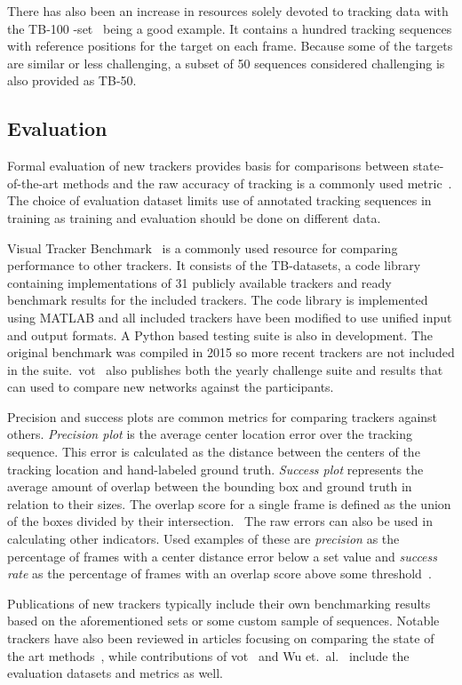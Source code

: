 There has also been an increase in resources solely devoted to tracking data with the TB-100 -set~\cite{VTB} being a good example. It contains a hundred tracking sequences with reference positions for the target on each frame. Because some of the targets are similar or less challenging, a subset of 50 sequences considered challenging is also provided as TB-50.~\cite{OT_BENCH}

\subsection{Evaluation}
Formal evaluation of new trackers provides basis for comparisons between state-of-the-art methods and the raw accuracy of tracking is a commonly used metric~\cite{OT_BENCH}. The choice of evaluation dataset limits use of annotated tracking sequences in training as training and evaluation should be done on different data.

Visual Tracker Benchmark~\cite{VTB} is a commonly used resource for comparing performance to other trackers. It consists of the TB-datasets, a code library containing implementations of 31 publicly available trackers and ready benchmark results for the included trackers. The code library is implemented using MATLAB and all included trackers have been modified to use unified input and output formats. A Python based testing suite is also in development. The original benchmark was compiled in 2015 so more recent trackers are not included in the suite.~\ac{vot}~\cite{VOT} also publishes both the yearly challenge suite and results that can used to compare new networks against the participants.

Precision and success plots are common metrics for comparing trackers against others. \textit{Precision plot} is the average center location error over the tracking sequence. This error is calculated as the distance between the centers of the tracking location and hand-labeled ground truth. \textit{Success plot} represents the average amount of overlap between the bounding box and ground truth in relation to their sizes. The overlap score for a single frame is defined as the union of the boxes divided by their intersection.~\cite{OT_BENCH} The raw errors can also be used in calculating other indicators. Used examples of these are \textit{precision} as the percentage of frames with a center distance error below a set value and \textit{success rate} as the percentage of frames with an overlap score above some threshold~\cite{DEEPTRACK}.

Publications of new trackers typically include their own benchmarking results based on the aforementioned sets or some custom sample of sequences. Notable trackers have also been reviewed in articles focusing on comparing the state of the art methods~\cite{OT_BENCH}, while contributions of \ac{vot}~\cite{VOT} and Wu et.~al.~\cite{OT_BENCH} include the evaluation datasets and metrics as well.
